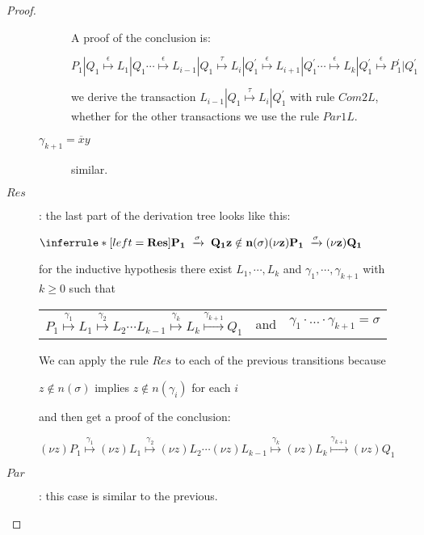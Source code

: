 \begin{proposition}
\begin{proof}
\begin{description}
\begin{description}
	    A proof of the conclusion is:
	    \begin{center}
	      $
		  P_{1}|Q_{1} \stackrel{\epsilon}{\longmapsto} L_{1}|Q_{1} 
		  \cdots
			      \stackrel{\epsilon}{\longmapsto} L_{i-1}|Q_{1} 
			      \stackrel{\tau}{\longmapsto} L_{i}|Q_{1}^{'}
			      \stackrel{\epsilon}{\longmapsto} L_{i+1}|Q_{1}^{'}
		  \cdots 
			      \stackrel{\epsilon}{\longmapsto} L_{k}|Q_{1}^{'}
			      \stackrel{\epsilon}{\longmapsto} P_{1}^{'}|Q_{1}^{'}$	  
	    \end{center}
	    we derive the transaction $ L_{i-1}|Q_{1} \stackrel{\tau}{\longmapsto} L_{i}|Q_{1}^{'}$ with rule $Com2L$, whether for the other transactions  we use the rule $Par1L$.
	  \item[$\gamma_{k+1}=\overline{x}y$] similar.
	\end{description}
      \item[$Res$]: 
	the last part of the derivation tree looks like this:
	\begin{center}
	  $\inferrule* [left=\bf{Res}]{
	      P_{1}\; \xrightarrow{\sigma}\; Q_{1}
	    \\
	      z\notin n(\sigma)
	  }{
	    (\nu z) P_{1} \;\xrightarrow{\sigma} (\nu z) Q_{1}
	  }$
	\end{center}
	for the inductive hypothesis there exist $L_{1}, \cdots, L_{k}$ and $\gamma_{1}, \cdots, \gamma_{k+1}$ with $k\geq 0$ such that 
	\begin{center}
	  \begin{tabular}{lll}
	    $P_{1} \stackrel{\gamma_{1}}{\longmapsto} L_{1}  \stackrel{\gamma_{2}}{\longmapsto} L_{2} \cdots L_{k-1} \stackrel{\gamma_{k}}{\longmapsto} L_{k} \stackrel{\gamma_{k+1}}{\longmapsto} Q_{1}$ 
	  &
	    and
	  &
	    $\gamma_{1} \cdot \ldots \cdot \gamma_{k+1} =  \sigma$
	  \end{tabular}
	\end{center}
	We can apply the rule $Res$ to each of the previous transitions because 
	\begin{center}
	  $z\notin n(\sigma)$ implies $z\notin n(\gamma_{i})$ for each $i$
	\end{center}
	and then get a proof of the conclusion:
	\begin{center}
	  $(\nu z)P_{1} \stackrel{\gamma_{1}}{\longmapsto} (\nu z)L_{1}  \stackrel{\gamma_{2}}{\longmapsto} (\nu z)L_{2} \cdots (\nu z)L_{k-1} \stackrel{\gamma_{k}}{\longmapsto} (\nu z)L_{k} \stackrel{\gamma_{k+1}}{\longmapsto} (\nu z)Q_{1}$
	\end{center}
      \item[$Par$]: this case is similar to the previous.

\end{description}
\end{proof}
\end{proposition}
